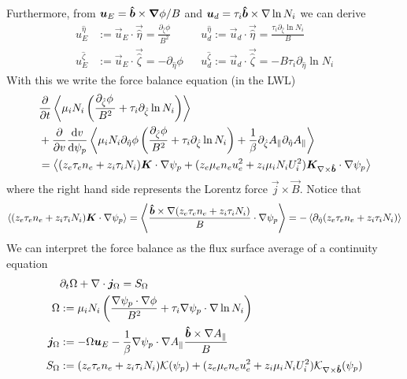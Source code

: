 Furthermore, from ${\boldsymbol{u}}_E = \bm{\hat{b}}\times {\boldsymbol{\nabla}}\phi/B$ and ${\boldsymbol{u}}_d = \tau_i \bm{\hat{b}}\times\nabla \ln N_i$
we can derive
\begin{align}
u_E^{\hat\eta} &:= \vec u_E\cdot \vec{\hat\eta} = \frac{\partial_{\hat\zeta} \phi}{B^2}
&&u_d^{\hat\eta} := \vec u_d\cdot \vec{\hat\eta} =  \frac{\tau_i \partial_{\hat\zeta} \ln N_i}{B} \\
u_E^{\hat\zeta}&:= \vec u_E\cdot \vec{\hat\zeta}  = -\partial_{\hat\eta} \phi
&&u_d^{\hat\zeta}:= \vec u_d\cdot \vec{\hat\zeta} = -B \tau_i \partial_{\hat\eta} \ln N_i
\end{align}
With this we write the force balance equation (in the LWL)
\begin{align}
&\frac{\partial}{\partial t} \left\langle \mu_i N_i \left(
\frac{\partial_{\hat\zeta}\phi\,}{B^2} + \tau_i \partial_{\hat\zeta} \ln N_i\right) \right\rangle
\nonumber\\
&+ \frac{\partial}{\partial v} \frac{\mathrm{d} v}{\mathrm{d}\psi_p} \left\langle \mu_i N_i\partial_{\hat\eta} \phi \left(\frac{\partial_{\hat\zeta}\phi }{B^2}
+ \tau_i \partial_{\hat\zeta} \ln N_i \right) + \frac{1}{\beta} \partial_{\hat\zeta} A_\parallel \partial_{\hat\eta}A_\parallel \right\rangle
\nonumber\\
&= \left\langle (z_e \tau_e n_e + z_i\tau_i N_i){\boldsymbol{K}}\cdot\nabla\psi_p + (z_e\mu_e n_eu_e^2 + z_i\mu_i N_iU_i^2){\boldsymbol{K}}_{\nabla\times\bm{\hat{b}}}\cdot\nabla\psi_p \right\rangle
\end{align}
where the right hand side represents the Lorentz force $\vec j\times\vec B$.
Notice that 
\begin{align}
\left\langle (z_e \tau_e n_e + z_i\tau_i N_i){\boldsymbol{K}}\cdot\nabla\psi_p\right\rangle
= \left\langle \frac{ \bm{\hat{b}}\times \nabla (z_e\tau_e n_e + z_i\tau_i N_i)}{B}\cdot\nabla\psi_p\right\rangle
= -\left\langle\partial_{\hat\eta} (z_e\tau_e n_e + z_i\tau_i N_i)\right\rangle
\end{align}
We can interpret the force balance as the flux surface average of a
continuity equation
\begin{align}
&\partial_t \Omega + \nabla\cdot {\boldsymbol{j}}_\Omega = S_\Omega \\
\Omega &:= \mu_i N_i \left(\frac{\nabla\psi_p\cdot\nabla\phi}{B^2} + \tau_i \nabla\psi_p \cdot\nabla \ln N_i\right) \\
{\boldsymbol{j}}_{\Omega} &:= -\Omega {\boldsymbol{u}}_E 
    - \frac{1}{\beta} \nabla\psi_p\cdot\nabla A_\parallel \frac{\bm{\hat{b}}\times\nabla A_\parallel}{B} \\
    S_\Omega &:=  (z_e \tau_e n_e + z_i\tau_i N_i)\mathcal K(\psi_p) + (z_e\mu_e n_eu_e^2 + z_i\mu_i N_iU_i^2)\mathcal K_{\nabla\times\bm{\hat{b}}}(\psi_p)
\end{align}



